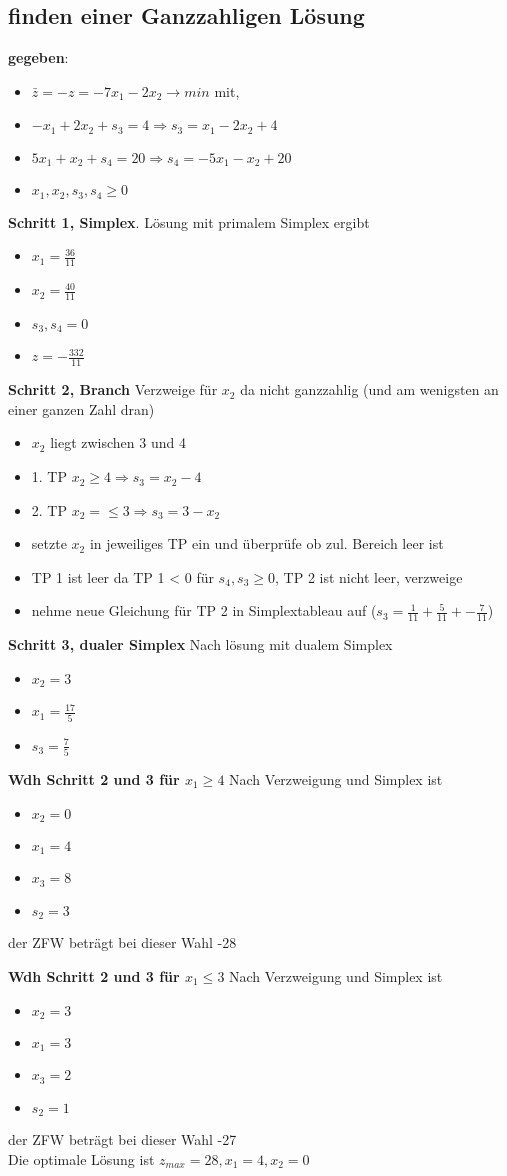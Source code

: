 \documentclass[12pt,a4paper, hyperref]{article}
\begin{document}
\subsection{finden einer Ganzzahligen Lösung}
\textbf{gegeben}:
\begin{itemize}
\item $\bar{z} = -z = -7x_1 -2x_2 \rightarrow min$ mit,
\item $-x_1 + 2x_2 + s_3 = 4 \Rightarrow s_3 = x_1 -2x_2 +4$
\item $5x_1 + x_2 + s_4 = 20 \Rightarrow s_4 = -5x_1 -x_2 + 20$
\item $x_1, x_2, s_3, s_4 \geq 0$
\end{itemize}
\textbf{Schritt 1, Simplex}.
Lösung mit primalem Simplex ergibt
\begin{itemize}
\item $x_1 = \frac{36}{11}$
\item $x_2 = \frac{40}{11}$
\item $s_3, s_4 = 0$
\item $z = -\frac{332}{11}$
\end{itemize}
\textbf{Schritt 2, Branch}
Verzweige für $x_2$ da nicht ganzzahlig (und am wenigsten an einer ganzen Zahl dran)
\begin{itemize}
\item $x_2$ liegt zwischen 3 und 4
\item 1. TP $x_2 \geq 4 \Rightarrow s_3 = x_2 -4$
\item 2. TP $x_2 = \leq 3 \Rightarrow s_3 = 3 - x_2$
\item setzte $x_2$ in jeweiliges TP ein und überprüfe ob zul. Bereich leer ist
\item TP 1 ist leer da TP 1 < 0 für $s_4, s_3 \geq 0$, TP 2 ist nicht leer, verzweige
\item nehme neue Gleichung für TP 2 in Simplextableau auf ($ s_3 = \frac{1}{11} + \frac{5}{11} + -\frac{7}{11}$)
\end{itemize}
\textbf{Schritt 3, dualer Simplex}
Nach lösung mit dualem Simplex
\begin{itemize}
\item $x_2 = 3$
\item $x_1 = \frac{17}{5}$
\item $s_3 = \frac{7}{5}$
\end{itemize}
\textbf{Wdh Schritt 2 und 3 für $x_1 \geq 4$}
Nach Verzweigung und Simplex ist
\begin{itemize}
\item $x_2 = 0$
\item $x_1 = 4$
\item $x_3 = 8$
\item $s_2 = 3$
\end{itemize}
der ZFW beträgt bei dieser Wahl -28

\textbf{Wdh Schritt 2 und 3 für $x_1 \leq 3$}
Nach Verzweigung und Simplex ist
\begin{itemize}
\item $x_2 = 3$
\item $x_1 = 3$
\item $x_3 = 2$
\item $s_2 = 1$
\end{itemize}
der ZFW beträgt bei dieser Wahl -27\\

Die optimale Lösung ist $z_{max} = 28, x_1 = 4, x_2 = 0$
\end{document}
